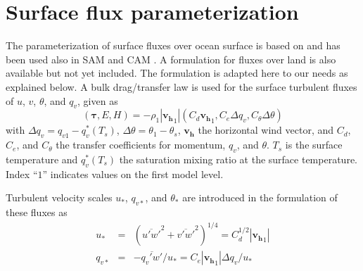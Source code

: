 \documentclass[dvipdfmx,a4paper,10pt]{article}
\begin{document}
 \section{Surface flux parameterization}\label{sec:sfcfluxes}
% 
% 
% 
% 

The parameterization of surface fluxes over ocean surface is based on \cite{bryan03} and has been used also in SAM \citep{khairou03} and CAM \citep[see][section 4.10.2]{collins04}. A formulation for fluxes over land is also available but not yet included. The formulation is adapted here to our needs as explained below. A bulk drag/transfer law is used for the surface turbulent fluxes of $u$, $v$, $\theta$, and $q_v$, given as
\begin{equation}\label{eqn:fluxes}
 (\mathbf{\tau}, E, H)=-\rho_1|\mathbf{v_h}_1| (C_d \mathbf{v_h}_1, C_e \Delta q_v, C_{\theta} \Delta \theta )
\end{equation}
with $\Delta q_v=q_{v1}-q_v^*(T_s)$, $\Delta \theta=\theta_{1}-\theta_{s}$, $\mathbf{v_h}$ the horizontal wind vector, and $C_d$, $C_e$, and $C_{\theta}$ the transfer coefficients for momentum, $q_v$, and $\theta$. $T_s$ is the surface temperature and $q_v^*(T_s)$ the saturation mixing ratio at the surface temperature. Index ``$1$'' indicates values on the first model level. 

Turbulent velocity scales $u_*$, $q_{v*}$, and $\theta_{*}$ are introduced in the formulation of these fluxes as 
\begin{eqnarray}
 u_*&=& (\overline{u'w'}^2+\overline{v'w'}^2)^{1/4} = C_d^{1/2} | \mathbf{v_h}_1 |\\
 q_{v*}&=& -\overline{q_v'w'}/u_*=C_e |\mathbf{v_h}_1| \Delta q_v / u_*\label{eqn:velqv}
\end{eqnarray}
\end{document}
